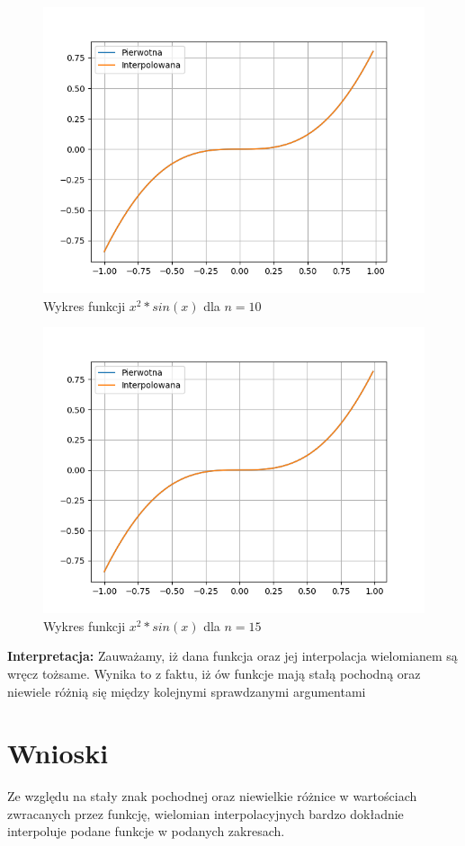 \documentclass[a4paper,14pt]{report}
\begin{document}
    \begin{figure}[H]
      \includegraphics[scale=0.75]{b-10}
      \centering
      \caption{Wykres funkcji $x^{2}*sin(x)$ dla $n=10$}
    \end{figure}
    \begin{figure}[H]
      \includegraphics[scale=0.75]{b-15}
      \centering
      \caption{Wykres funkcji $x^{2}*sin(x)$ dla $n=15$}
    \end{figure}
    \textbf{Interpretacja: } Zauważamy, iż dana funkcja oraz jej interpolacja wielomianem są wręcz tożsame. Wynika to z faktu, iż ów funkcje mają stałą pochodną oraz niewiele różnią się między kolejnymi sprawdzanymi argumentami
  \section{Wnioski}
    Ze względu na stały znak pochodnej oraz niewielkie różnice w wartościach zwracanych przez funkcję, wielomian interpolacyjnych bardzo dokładnie interpoluje podane funkcje w podanych zakresach.
\end{document}
